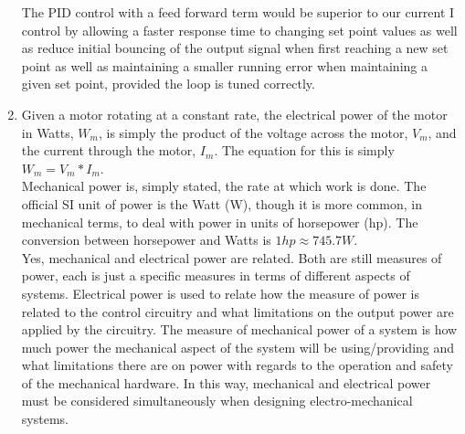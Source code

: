 \documentclass{article}
\begin{document}
\begin{enumerate}
			The PID control with a feed forward term would be superior to our current I control by allowing a faster response time to changing set point values as well as reduce initial bouncing of the output signal when first reaching a new set point as well as maintaining a smaller running error when maintaining a given set point, provided the loop is tuned correctly.
		\item %
			Given a motor rotating at a constant rate, the electrical power of the motor in Watts, $W_m$, is simply the product of the voltage across the motor, $V_m$, and the current through the motor, $I_m$. The equation for this is simply $W_m = V_m * I_m$.\\
			Mechanical power is, simply stated, the rate at which work is done. The official SI unit of power is the Watt (W), though it is more common, in mechanical terms, to deal with power in units of horsepower (hp). The conversion between horsepower and Watts is $1 hp \approx 745.7 W$.\\
			Yes, mechanical and electrical power are related. Both are still measures of power, each is just a specific measures in terms of different aspects of systems. Electrical power is used to relate how the measure of power is related to the control circuitry and what limitations on the output power are applied by the circuitry. The measure of mechanical power of a system is how much power the mechanical aspect of the system will be using/providing and what limitations there are on power with regards to the operation and safety of the mechanical hardware. In this way, mechanical and electrical power must be considered simultaneously when designing electro-mechanical systems.
	\end{enumerate}
\end{document}

